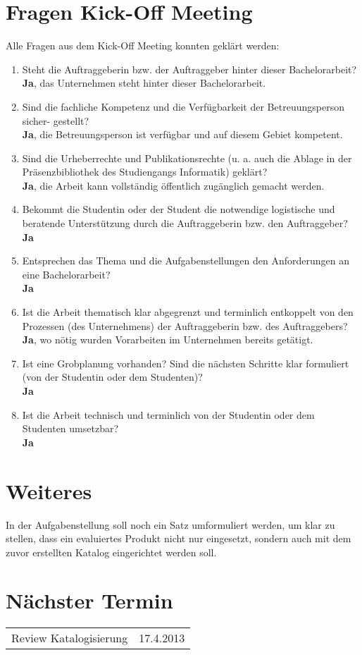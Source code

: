 \documentclass[]{scrreprt}
\begin{document}
    \section{Fragen Kick-Off Meeting}
    Alle Fragen aus dem Kick-Off Meeting konnten geklärt werden:
    \begin{enumerate}
        \item Steht die Auftraggeberin bzw. der Auftraggeber hinter dieser Bachelorarbeit? \\
            {\bf Ja}, das Unternehmen steht hinter dieser Bachelorarbeit.
        \item Sind die fachliche Kompetenz und die Verfügbarkeit der Betreuungsperson sicher- gestellt? \\
            {\bf Ja}, die Betreuungsperson ist verfügbar und auf diesem Gebiet kompetent.
        \item Sind die Urheberrechte und Publikationsrechte (u. a. auch die Ablage in der Präsenzbibliothek des Studiengangs Informatik) geklärt? \\
            {\bf Ja}, die Arbeit kann vollständig öffentlich zugänglich gemacht
            werden.
        \item Bekommt die Studentin oder der Student die notwendige logistische und beratende Unterstützung durch die Auftraggeberin bzw. den Auftraggeber? \\
            {\bf Ja}
        \item Entsprechen das Thema und die Aufgabenstellungen den Anforderungen an eine Bachelorarbeit? \\
            {\bf Ja}
        \item Ist die Arbeit thematisch klar abgegrenzt und terminlich entkoppelt von den Prozessen (des Unternehmens) der Auftraggeberin bzw. des Auftraggebers? \\
            {\bf Ja}, wo nötig wurden Vorarbeiten im Unternehmen bereits getätigt.
        \item Ist eine Grobplanung vorhanden? Sind die nächsten Schritte klar formuliert (von der Studentin oder dem Studenten)? \\
            {\bf Ja}
        \item Ist die Arbeit technisch und terminlich von der Studentin oder dem Studenten umsetzbar? \\
            {\bf Ja}
    \end{enumerate}
    
    \pagebreak
    \section{Weiteres}
      In der Aufgabenstellung soll noch ein Satz umformuliert werden, um klar zu stellen, dass ein evaluiertes Produkt nicht nur eingesetzt, sondern auch mit dem zuvor erstellten Katalog eingerichtet werden soll.
    
    \section{Nächster Termin}
    \begin{tabular}{l r}
        Review Katalogisierung & 17.4.2013 \\
    \end{tabular}
    
\end{document}
